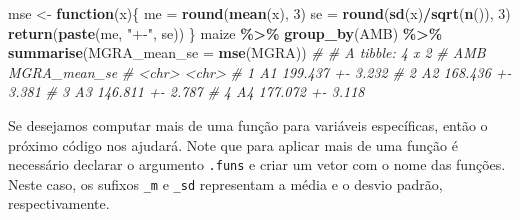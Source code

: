 \documentclass[
]{book}
\newenvironment{Shaded}{\begin{snugshade}}{\end{snugshade}}
\newcommand{\CommentTok}[1]{\textcolor[rgb]{0.56,0.35,0.01}{\textit{#1}}}
\newcommand{\ControlFlowTok}[1]{\textcolor[rgb]{0.13,0.29,0.53}{\textbf{#1}}}
\newcommand{\DataTypeTok}[1]{\textcolor[rgb]{0.13,0.29,0.53}{#1}}
\newcommand{\DecValTok}[1]{\textcolor[rgb]{0.00,0.00,0.81}{#1}}
\newcommand{\KeywordTok}[1]{\textcolor[rgb]{0.13,0.29,0.53}{\textbf{#1}}}
\newcommand{\NormalTok}[1]{#1}
\newcommand{\OperatorTok}[1]{\textcolor[rgb]{0.81,0.36,0.00}{\textbf{#1}}}
\newcommand{\StringTok}[1]{\textcolor[rgb]{0.31,0.60,0.02}{#1}}
\numberwithin{equation}{section}
\begin{document}
\begin{Shaded}
\begin{Highlighting}[]
\NormalTok{mse \textless{}{-}}\StringTok{ }\ControlFlowTok{function}\NormalTok{(x)\{}
\NormalTok{  me =}\StringTok{ }\KeywordTok{round}\NormalTok{(}\KeywordTok{mean}\NormalTok{(x), }\DecValTok{3}\NormalTok{)}
\NormalTok{  se =}\StringTok{ }\KeywordTok{round}\NormalTok{(}\KeywordTok{sd}\NormalTok{(x)}\OperatorTok{/}\KeywordTok{sqrt}\NormalTok{(}\KeywordTok{n}\NormalTok{()), }\DecValTok{3}\NormalTok{)}
  \KeywordTok{return}\NormalTok{(}\KeywordTok{paste}\NormalTok{(me, }\StringTok{"+{-}"}\NormalTok{, se))}
\NormalTok{\}}
\NormalTok{maize }\OperatorTok{\%\textgreater{}\%}\StringTok{ }
\StringTok{  }\KeywordTok{group\_by}\NormalTok{(AMB) }\OperatorTok{\%\textgreater{}\%}
\StringTok{  }\KeywordTok{summarise}\NormalTok{(}\DataTypeTok{MGRA\_mean\_se =} \KeywordTok{mse}\NormalTok{(MGRA))}
\CommentTok{\# \# A tibble: 4 x 2}
\CommentTok{\#   AMB   MGRA\_mean\_se    }
\CommentTok{\#   \textless{}chr\textgreater{} \textless{}chr\textgreater{}           }
\CommentTok{\# 1 A1    199.437 +{-} 3.232}
\CommentTok{\# 2 A2    168.436 +{-} 3.381}
\CommentTok{\# 3 A3    146.811 +{-} 2.787}
\CommentTok{\# 4 A4    177.072 +{-} 3.118}
\end{Highlighting}
\end{Shaded}

Se desejamos computar mais de uma função para variáveis específicas, então o próximo código nos ajudará. Note que para aplicar mais de uma função é necessário declarar o argumento \texttt{.funs} e criar um vetor com o nome das funções. Neste caso, os sufixos \texttt{\_m} e \texttt{\_sd} representam a média e o desvio padrão, respectivamente.
\end{document}
